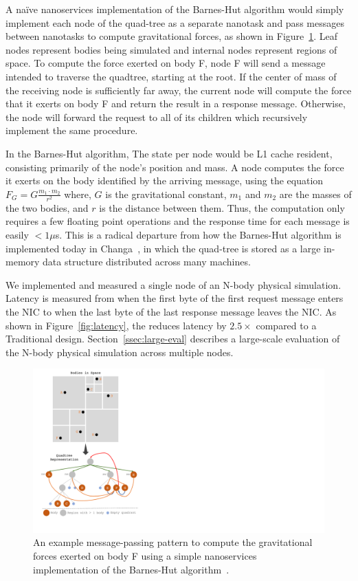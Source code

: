 A na\"ive nanoservices implementation of the Barnes-Hut algorithm would simply implement each node of the quad-tree as a separate nanotask and pass messages between nanotasks to compute gravitational forces, as shown in Figure~\ref{fig:barnes-hut}. 
Leaf nodes represent bodies being simulated and internal nodes represent regions of space. 
To compute the force exerted on body F, node F will send a message intended to traverse the quadtree, starting at the root. 
If the center of mass of the receiving node is sufficiently far away, the current node will compute the force that it exerts on body F and return the result in a response message. 
Otherwise, the node will forward the request to all of its children which recursively implement the same procedure.

In the Barnes-Hut algorithm, The state per node would be L1 cache resident, consisting primarily of the node's position and mass.
A node computes the force it exerts on the body identified by the arriving message, using the equation
 $F_G = G\frac{m_1 \cdot m_2}{r^2} $
where, $G$ is the gravitational constant, $m_1$ and $m_2$ are the masses of the two bodies, and $r$ is the distance between them.
Thus, the computation only requires a few floating point operations and the response time for each message is easily $<1\mu$s. 
This is a radical departure from how the Barnes-Hut algorithm is implemented today in Changa~\cite{changa}, in which the quad-tree is stored as a large in-memory data structure distributed across many machines.

We implemented and measured a single node of an N-body physical simulation. Latency is measured from when the first byte of the first request message enters the NIC to when the last byte of the last response message leaves the NIC.
As shown in Figure~\ref{fig:latency}, the \name{} reduces latency by $2.5\times$ compared to a Traditional design. 
Section~\ref{ssec:large-eval} describes a large-scale evaluation of the N-body physical simulation across multiple nodes. 

\begin{figure}
 \includegraphics[width=0.9\linewidth]{./figures/barneshut-algo}
 \caption{An example message-passing pattern to compute the gravitational forces exerted on body F using a simple nanoservices implementation of the Barnes-Hut algorithm~\cite{barnes-hut}.}
 \label{fig:barnes-hut}
\end{figure}

